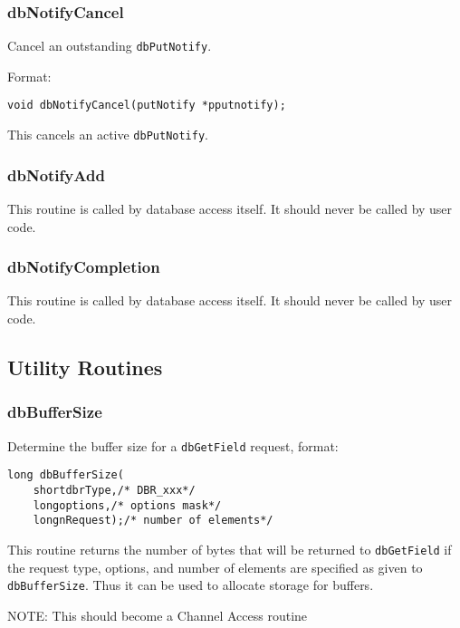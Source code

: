 \subsubsection{dbNotifyCancel}

Cancel an outstanding \verb|dbPutNotify|.

Format:

\begin{verbatim}void dbNotifyCancel(putNotify *pputnotify);
\end{verbatim}This cancels an active \verb|dbPutNotify|.

\subsubsection{dbNotifyAdd}

This routine is called by database access itself. It should never be called by user code.

\subsubsection{dbNotifyCompletion}

This routine is called by database access itself. It should never be called by user code.

\subsection{Utility Routines}

\subsubsection{dbBufferSize}

Determine the buffer size for a \verb|dbGetField| request, format:

\begin{verbatim}long dbBufferSize(
    shortdbrType,/* DBR_xxx*/
    longoptions,/* options mask*/
    longnRequest);/* number of elements*/
\end{verbatim}This routine returns the number of bytes that will be returned to \verb|dbGetField| if the request type, options, and number of 
elements are specified as given to \verb|dbBufferSize|. Thus it can be used to allocate storage for buffers.

NOTE: This should become a Channel Access routine

